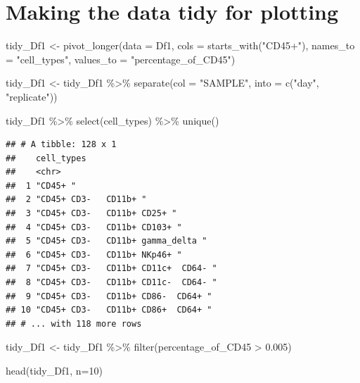 \documentclass[
]{book}
\newenvironment{Shaded}{\begin{snugshade}}{\end{snugshade}}
\newcommand{\AttributeTok}[1]{\textcolor[rgb]{0.77,0.63,0.00}{#1}}
\newcommand{\DecValTok}[1]{\textcolor[rgb]{0.00,0.00,0.81}{#1}}
\newcommand{\FloatTok}[1]{\textcolor[rgb]{0.00,0.00,0.81}{#1}}
\newcommand{\FunctionTok}[1]{\textcolor[rgb]{0.00,0.00,0.00}{#1}}
\newcommand{\NormalTok}[1]{#1}
\newcommand{\OtherTok}[1]{\textcolor[rgb]{0.56,0.35,0.01}{#1}}
\newcommand{\SpecialCharTok}[1]{\textcolor[rgb]{0.00,0.00,0.00}{#1}}
\newcommand{\StringTok}[1]{\textcolor[rgb]{0.31,0.60,0.02}{#1}}
\begin{document}
\hypertarget{making-the-data-tidy-for-plotting}{%
\section{Making the data tidy for plotting}\label{making-the-data-tidy-for-plotting}}

\begin{Shaded}
\begin{Highlighting}[]
\NormalTok{tidy\_Df1 }\OtherTok{\textless{}{-}} \FunctionTok{pivot\_longer}\NormalTok{(}\AttributeTok{data =}\NormalTok{ Df1, }\AttributeTok{cols =}  \FunctionTok{starts\_with}\NormalTok{(}\StringTok{"CD45+"}\NormalTok{), }\AttributeTok{names\_to =} \StringTok{"cell\_types"}\NormalTok{, }\AttributeTok{values\_to =} \StringTok{"percentage\_of\_CD45"}\NormalTok{) }

\NormalTok{tidy\_Df1 }\OtherTok{\textless{}{-}}\NormalTok{ tidy\_Df1 }\SpecialCharTok{\%\textgreater{}\%}
  \FunctionTok{separate}\NormalTok{(}\AttributeTok{col =} \StringTok{"SAMPLE"}\NormalTok{, }\AttributeTok{into =} \FunctionTok{c}\NormalTok{(}\StringTok{"day"}\NormalTok{, }\StringTok{"replicate"}\NormalTok{))}


\NormalTok{tidy\_Df1 }\SpecialCharTok{\%\textgreater{}\%}
  \FunctionTok{select}\NormalTok{(cell\_types) }\SpecialCharTok{\%\textgreater{}\%}
  \FunctionTok{unique}\NormalTok{()}
\end{Highlighting}
\end{Shaded}

\begin{verbatim}
## # A tibble: 128 x 1
##    cell_types                          
##    <chr>                               
##  1 "CD45+ "                            
##  2 "CD45+ CD3-   CD11b+ "              
##  3 "CD45+ CD3-   CD11b+ CD25+ "        
##  4 "CD45+ CD3-   CD11b+ CD103+ "       
##  5 "CD45+ CD3-   CD11b+ gamma_delta "  
##  6 "CD45+ CD3-   CD11b+ NKp46+ "       
##  7 "CD45+ CD3-   CD11b+ CD11c+  CD64- "
##  8 "CD45+ CD3-   CD11b+ CD11c-  CD64- "
##  9 "CD45+ CD3-   CD11b+ CD86-  CD64+ " 
## 10 "CD45+ CD3-   CD11b+ CD86+  CD64+ " 
## # ... with 118 more rows
\end{verbatim}

\begin{Shaded}
\begin{Highlighting}[]
\NormalTok{tidy\_Df1 }\OtherTok{\textless{}{-}}\NormalTok{ tidy\_Df1 }\SpecialCharTok{\%\textgreater{}\%}
  \FunctionTok{filter}\NormalTok{(percentage\_of\_CD45 }\SpecialCharTok{\textgreater{}} \FloatTok{0.005}\NormalTok{)}

\FunctionTok{head}\NormalTok{(tidy\_Df1, }\AttributeTok{n=}\DecValTok{10}\NormalTok{)}
\end{Highlighting}
\end{Shaded}
\end{document}
